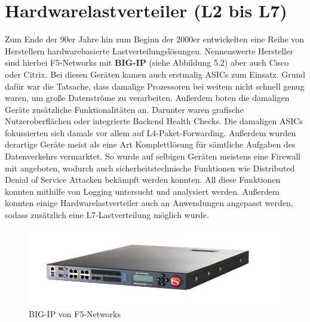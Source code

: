 \section{Hardwarelastverteiler (L2 bis L7)}
Zum Ende der 90er Jahre hin zum Beginn der 2000er entwickelten eine Reihe von Herstellern hardwarebasierte Lastverteilungslösungen. Nennenswerte Hersteller sind hierbei F5-Networks mit \textbf{BIG-IP} (siehe Abbildung 5.2) aber auch Cisco oder Citrix. Bei diesen Geräten kamen auch erstmalig ASICs zum Einsatz. Grund dafür war die Tatsache, dass damalige Prozessoren bei weitem nicht schnell genug waren, um große Datenströme zu verarbeiten. Außerdem boten die damaligen Geräte zusätzliche Funktionalitäten an. Darunter waren grafische Nutzeroberflächen oder integrierte Backend Health Checks. \cite{bigip} Die damaligen ASICs fokussierten sich damals vor allem auf L4-Paket-Forwarding. Außerdem wurden derartige Geräte meist als eine Art Komplettlösung für sämtliche Aufgaben des Datenverkehrs vermarktet. So wurde auf selbigen Geräten meistens eine Firewall mit angeboten, wodurch auch sicherheitstechnische Funktionen wie Distributed Denial of Service Attacken bekämpft werden konnten. All diese Funktionen konnten mithilfe von Logging untersucht und analysiert werden. Außerdem konnten einige Hardwarelastverteiler auch an Anwendungen angepasst werden, sodass zusätzlich eine L7-Lastverteilung möglich wurde.
\begin{figure}
    \centering
    \includegraphics[width=0.8\linewidth]{images/s-l1600.jpg}
    \caption{BIG-IP von F5-Networks \cite{wtit_bigip_5000_series}}
    \label{fig:enter-label}
\end{figure}
